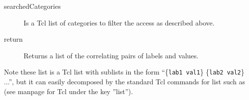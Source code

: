    \begin{method}{  }
    	  \begin{description}	
	     \item[ searchedCategories]
		Is a Tcl list of categories to filter the access 
		 as described above.
	     \item[ return]       
		Returns a list of the correlating pairs of labels and values.
	  \end{description}
	Note these list is a Tcl list with sublists in the form
	 ``\{{\tt lab1 val1}\} \{{\tt lab2 val2}\} ...'', but it can easily 
	 decomposed by the standard Tcl commands for list such as 
		(see manpage for Tcl under the key ''list'').
	\end{method}	



